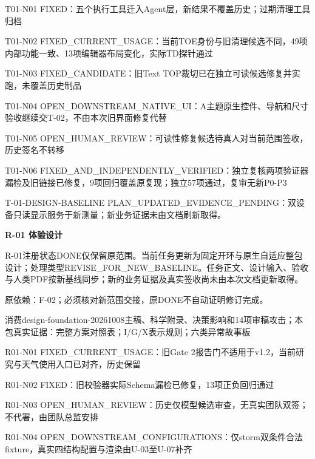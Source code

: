 \documentclass[11pt,a4paper]{article}
\newcommand{\reviewsection}[1]{\par\Needspace{5\baselineskip}\vspace{10pt}\begin{center}{\titlelatin\titlecjk\bfseries\fontsize{14}{20}\selectfont #1}\end{center}}
\begin{document}
T01-\allowbreak{}N01 FIXED：五个执行工具迁入Agent层，新结果不覆盖历史；过期清理工具归档


T01-\allowbreak{}N02 FIXED\_\allowbreak{}CURRENT\_\allowbreak{}USAGE：当前TOE身份与旧清理候选不同，49项内部功能一致、13项编辑器布局变化，实际TD探针通过


T01-\allowbreak{}N03 FIXED\_\allowbreak{}CANDIDATE：旧Text TOP裁切已在独立可读候选修复并实跑，未覆盖历史制品


T01-\allowbreak{}N04 OPEN\_\allowbreak{}DOWNSTREAM\_\allowbreak{}NATIVE\_\allowbreak{}UI：A主题原生控件、导航和尺寸验收继续交T-\allowbreak{}02，不由本次旧界面修复代替


T01-\allowbreak{}N05 OPEN\_\allowbreak{}HUMAN\_\allowbreak{}REVIEW：可读性修复候选待真人对当前范围签收，历史签名不转移


T01-\allowbreak{}N06 FIXED\_\allowbreak{}AND\_\allowbreak{}INDEPENDENTLY\_\allowbreak{}VERIFIED：独立复核两项验证器漏检及旧链接已修复，9项回归覆盖原复现；独立57项通过，复审无新P0-\allowbreak{}P3


T-\allowbreak{}01-\allowbreak{}DESIGN-\allowbreak{}BASELINE PLAN\_\allowbreak{}UPDATED\_\allowbreak{}EVIDENCE\_\allowbreak{}PENDING：双设备只读显示服务于新测量；新业务证据未由文档刷新取得。


\reviewsection{R-\allowbreak{}01 体验设计}
R-\allowbreak{}01注册状态DONE仅保留原范围。当前任务更新为固定开环与原生自适应整包设计；处理类型REVISE\_\allowbreak{}FOR\_\allowbreak{}NEW\_\allowbreak{}BASELINE。任务正文、设计输入、验收与人类PDF按新基线同步；新的业务证据及真实签收尚未由本次文档更新取得。


原依赖：F-\allowbreak{}02；必须核对新范围交接，原DONE不自动证明修订完成。


消费design-\allowbreak{}foundation-\allowbreak{}20261008主稿、科学附录、决策影响和14项审稿攻击；本包真实证据：完整方案对照表；I/\allowbreak{}G/\allowbreak{}X表示规则；六类异常故事板


R01-\allowbreak{}N01 FIXED\_\allowbreak{}CURRENT\_\allowbreak{}USAGE：旧Gate 2报告门不适用于v1.2，当前研究与天气使用入口已对齐，历史保留


R01-\allowbreak{}N02 FIXED：旧校验器实际Schema漏检已修复，13项正负回归通过


R01-\allowbreak{}N03 OPEN\_\allowbreak{}HUMAN\_\allowbreak{}REVIEW：历史仅模型候选审查，无真实团队双签；不代署，由团队总监安排


R01-\allowbreak{}N04 OPEN\_\allowbreak{}DOWNSTREAM\_\allowbreak{}CONFIGURATIONS：仅storm双条件合法fixture，真实四结构配置与渲染由U-\allowbreak{}03至U-\allowbreak{}07补齐
\end{document}
